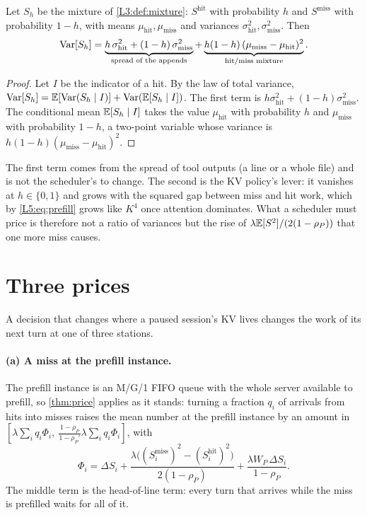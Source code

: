 \begin{lemma}\label{L5:lem:split}
Let $S_h$ be the mixture of \cref{L3:def:mixture}: $S^{\mathrm{hit}}$ with
probability $h$ and $S^{\mathrm{miss}}$ with probability $1-h$, with means
$\mu_{\mathrm{hit}},\mu_{\mathrm{miss}}$ and variances
$\sigma^2_{\mathrm{hit}},\sigma^2_{\mathrm{miss}}$. Then
\[
  \operatorname{Var}[S_h]=\underbrace{h\,\sigma^2_{\mathrm{hit}}+(1-h)\,\sigma^2_{\mathrm{miss}}}_{\text{spread of the appends}}
  +\underbrace{h(1-h)\,(\mu_{\mathrm{miss}}-\mu_{\mathrm{hit}})^2}_{\text{hit/miss mixture}} .
\]
\end{lemma}

\begin{proof}
Let $I$ be the indicator of a hit. By the law of total variance,
$\operatorname{Var}[S_h]=\mathbb{E}[\operatorname{Var}(S_h\mid I)]+\operatorname{Var}(\mathbb{E}[S_h\mid I])$. The first term is
$h\sigma^2_{\mathrm{hit}}+(1-h)\sigma^2_{\mathrm{miss}}$. The conditional
mean $\mathbb{E}[S_h\mid I]$ takes the value $\mu_{\mathrm{hit}}$ with probability
$h$ and $\mu_{\mathrm{miss}}$ with probability $1-h$, a two-point
variable whose variance is $h(1-h)(\mu_{\mathrm{miss}}-\mu_{\mathrm{hit}})^2$.
\end{proof}

The first term comes from the spread of tool outputs (a line or a whole file) and is
not the scheduler's to change. The second is the KV policy's lever: it vanishes at
$h\in\{0,1\}$ and grows with the squared gap between miss and hit work, which by
\eqref{L5:eq:prefill} grows like $K^4$ once attention dominates. What a scheduler
must price is therefore not a ratio of variances but the rise of
$\lambda\mathbb{E}[S^2]/(2(1-\rho_P))$ that one more miss causes.

\section{Three prices}\label{L5:sec:prices}

A decision that changes where a paused session's KV lives changes the work of its next
turn at one of three stations.

\paragraph{(a) A miss at the prefill instance.} The prefill instance is an M/G/1 FIFO
queue with the whole server available to prefill, so \cref{thm:price} applies as it
stands: turning a fraction $q_i$ of arrivals from hits into misses raises the mean number
at the prefill instance by an amount in
$[\lambda\sum_iq_i\Phi_i,\ \frac{1-\rho_P}{1-\rho_P'}\lambda\sum_iq_i\Phi_i]$, with
\[
  \Phi_i=\Delta S_i
   +\frac{\lambda\bigl((S_i^{\mathrm{miss}})^2-(S_i^{\mathrm{hit}})^2\bigr)}{2(1-\rho_P)}
   +\frac{\lambda W_P\,\Delta S_i}{1-\rho_P}.
\]
The middle term is the head-of-line term: every turn that arrives while the miss is
prefilled waits for all of it.

